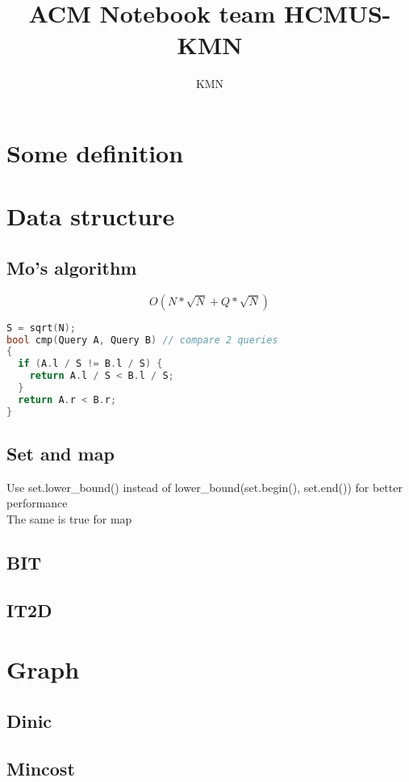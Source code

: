 \documentclass[A4 paper, 12pt, oneside]{article}
\title{ACM Notebook team HCMUS-KMN}
\author{KMN}
\begin{document}
	\begin{landscape}
	\begin{multicols}{2}
	\tableofcontents
	\small
	
\section{Some definition}
	

\section{Data structure}
	\subsection{Mo's algorithm}
\[O(N * \sqrt{N} + Q * \sqrt{N}) \]
	\begin{lstlisting}[language=C++]
S = sqrt(N);
bool cmp(Query A, Query B) // compare 2 queries
{
  if (A.l / S != B.l / S) {
    return A.l / S < B.l / S;
  }
  return A.r < B.r;
}
\end{lstlisting}
	
	\subsection{Set and map}
	Use set.lower_bound() instead of lower_bound(set.begin(), set.end()) for better performance \\
	The same is true for map
	
	\subsection{BIT}
	
	
	\subsection{IT2D}
	

\section{Graph}
	\subsection{Dinic}
	

	\subsection{Mincost}
	
	

\end{multicols}
\end{landscape}
\end{document}
